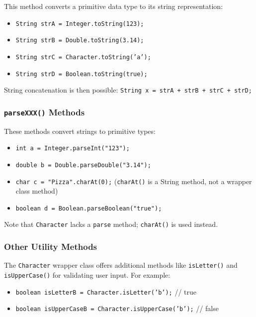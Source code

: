 \documentclass{article}
\begin{document}
This method converts a primitive data type to its string representation:

\begin{itemize}
    \item \texttt{String strA = Integer.toString(123);}
    \item \texttt{String strB = Double.toString(3.14);}
    \item \texttt{String strC = Character.toString('a');}
    \item \texttt{String strD = Boolean.toString(true);}
\end{itemize}

String concatenation is then possible: \texttt{String x = strA + strB + strC + strD;}

\subsubsection{\texttt{parseXXX()} Methods}

These methods convert strings to primitive types:

\begin{itemize}
    \item \texttt{int a = Integer.parseInt("123");}
    \item \texttt{double b = Double.parseDouble("3.14");}
    \item \texttt{char c = "Pizza".charAt(0);}  (\texttt{charAt()} is a String method, not a wrapper class method)
    \item \texttt{boolean d = Boolean.parseBoolean("true");}
\end{itemize}

Note that \texttt{Character} lacks a \texttt{parse} method;  \texttt{charAt()} is used instead.

\subsubsection{Other Utility Methods}

The \texttt{Character} wrapper class offers additional methods like \texttt{isLetter()} and \texttt{isUpperCase()} for validating user input.  For example:

\begin{itemize}
    \item \texttt{boolean isLetterB = Character.isLetter('b');} // true
    \item \texttt{boolean isUpperCaseB = Character.isUpperCase('b');} // false
\end{itemize}
\end{document}
